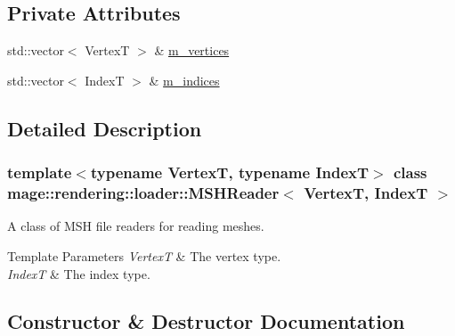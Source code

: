 \subsection*{Private Attributes}
\begin{DoxyCompactItemize}
\item 
std\+::vector$<$ VertexT $>$ \& \mbox{\hyperlink{classmage_1_1rendering_1_1loader_1_1_m_s_h_reader_a57e5f4e14aecbce999df14d0dcaba4e5}{m\+\_\+vertices}}
\item 
std\+::vector$<$ IndexT $>$ \& \mbox{\hyperlink{classmage_1_1rendering_1_1loader_1_1_m_s_h_reader_acf3ae948f5bb927a167bbb2e5d618916}{m\+\_\+indices}}
\end{DoxyCompactItemize}


\subsection{Detailed Description}
\subsubsection*{template$<$typename VertexT, typename IndexT$>$\newline
class mage\+::rendering\+::loader\+::\+M\+S\+H\+Reader$<$ Vertex\+T, Index\+T $>$}

A class of M\+SH file readers for reading meshes.


\begin{DoxyTemplParams}{Template Parameters}
{\em VertexT} & The vertex type. \\
\hline
{\em IndexT} & The index type. \\
\hline
\end{DoxyTemplParams}


\subsection{Constructor \& Destructor Documentation}
\mbox{\label{classmage_1_1rendering_1_1loader_1_1_m_s_h_reader_adf50a71f368cd580433b3dab5ea3a1ac}} 
